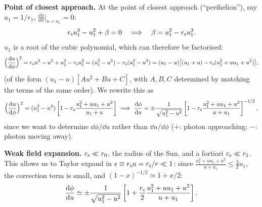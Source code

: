 \textbf{Point of closest approach.} At the point of closest approach (``perihelion''), say $u_1=1/r_1$, $\frac{\dd u}{\dd\phi}\big|_{u=u_1}=0$:
\[
  r_{\mathrm s} u_1^3-u_1^2+\beta=0\quad\Longrightarrow\quad\beta=u_1^2-r_{\mathrm s} u_1^3 .
\]
$u_1$ is a root of the cubic polynomial, which can therefore be factorised:
\begin{equation}
  \Big(\frac{\mathrm{d} u}{\mathrm{d}\phi}\Big)^2=r_{\mathrm s} u^3-u^2+u_1^2-r_{\mathrm s} u_1^3=(u_1^2-u^2)-r_{\mathrm s}(u_1^3-u^3)=(u_1-u)\big[(u_1+u)-r_{\mathrm s}(u_1^2+uu_1+u^2)\big],
\end{equation}
(of the form $(u_1-u)[Au^2+Bu+C]$, with $A,B,C$ determined by matching the terms of the same order). We rewrite this as
\[
  \Big(\frac{\mathrm{d} u}{\mathrm{d}\phi}\Big)^2=(u_1^2-u^2)\left[1-r_{\mathrm s}\frac{u_1^2+uu_1+u^2}{u_1+u}\right]
  \ \Longrightarrow\
  \frac{\mathrm{d}\phi}{\mathrm{d} u}=\pm\frac{1}{\sqrt{u_1^2-u^2}}\left[1-r_{\mathrm s}\frac{u_1^2+uu_1+u^2}{u+u_1}\right]^{-1/2},
\]
since we want to determine $\dd\phi/\dd u$ rather than $\dd u/\dd\phi$ ($+$: photon approaching; $-$: photon moving away).

\textbf{Weak field expansion.} $r_{\mathrm s}\ll r_0$, the radius of the Sun, and a fortiori $r_{\mathrm s}\ll r_1$. This allows us to Taylor expand in $\epsilon\equiv r_{\mathrm s} u=r_{\mathrm s}/r\ll1$: since $\frac{u_1^2+uu_1+u^2}{u+u_1}\le\frac32u_1$, the correction term is small, and $(1-x)^{-1/2}\simeq1+x/2$:
\begin{equation}
  \frac{\mathrm{d}\phi}{\mathrm{d} u}\simeq\pm\frac{1}{\sqrt{u_1^2-u^2}}\left[1+\frac{r_{\mathrm s}}2\frac{u_1^2+uu_1+u^2}{u+u_1}\right].
\end{equation}

